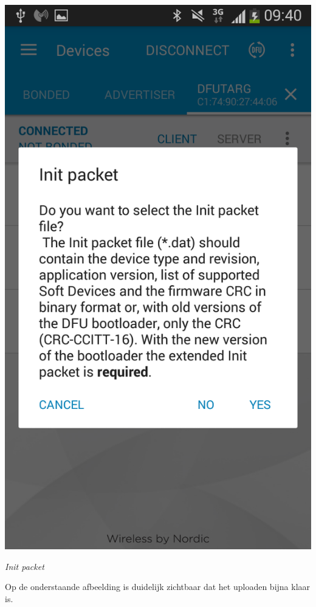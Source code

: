 \documentclass[conference]{IEEEtran}
\begin{document}
\begin{center}
    \includegraphics[scale=0.3]{FOTA8}
    \begin{minipage}{0.6\textwidth}
    \footnotesize
    \emph{Init packet}
    \end{minipage}
\end{center}

Op de onderstaande afbeelding is duidelijk zichtbaar dat het uploaden bijna klaar is.
\end{document}
